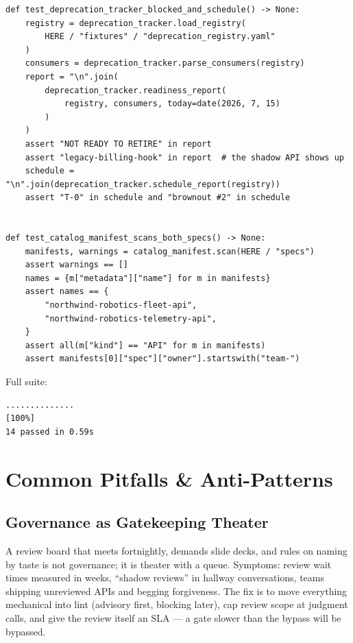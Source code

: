 \begin{verbatim}
def test_deprecation_tracker_blocked_and_schedule() -> None:
    registry = deprecation_tracker.load_registry(
        HERE / "fixtures" / "deprecation_registry.yaml"
    )
    consumers = deprecation_tracker.parse_consumers(registry)
    report = "\n".join(
        deprecation_tracker.readiness_report(
            registry, consumers, today=date(2026, 7, 15)
        )
    )
    assert "NOT READY TO RETIRE" in report
    assert "legacy-billing-hook" in report  # the shadow API shows up
    schedule = "\n".join(deprecation_tracker.schedule_report(registry))
    assert "T-0" in schedule and "brownout #2" in schedule


def test_catalog_manifest_scans_both_specs() -> None:
    manifests, warnings = catalog_manifest.scan(HERE / "specs")
    assert warnings == []
    names = {m["metadata"]["name"] for m in manifests}
    assert names == {
        "northwind-robotics-fleet-api",
        "northwind-robotics-telemetry-api",
    }
    assert all(m["kind"] == "API" for m in manifests)
    assert manifests[0]["spec"]["owner"].startswith("team-")
\end{verbatim}

Full suite:

\begin{verbatim}
..............                                                           [100%]
14 passed in 0.59s
\end{verbatim}

\section{Common Pitfalls \& Anti-Patterns}
\label{sec:ch20-pitfalls}

\subsection{Governance as Gatekeeping Theater}
\label{pit:theater}
A review board that meets fortnightly, demands slide decks, and rules on
naming by taste is not governance; it is theater with a queue. Symptoms:
review wait times measured in weeks, ``shadow reviews'' in hallway
conversations, teams shipping unreviewed APIs and begging forgiveness.
The fix is to move everything mechanical into lint (advisory first,
blocking later), cap review scope at judgment calls, and give the review
itself an SLA --- a gate slower than the bypass will be bypassed.

